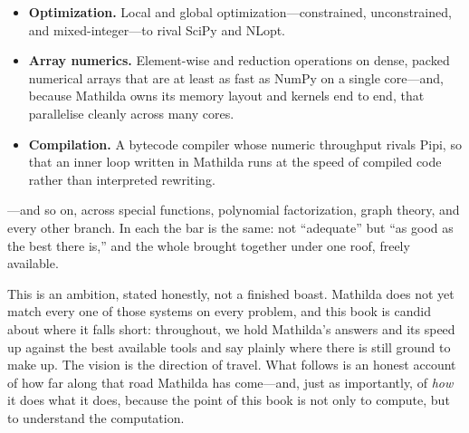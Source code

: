 \begin{itemize}
        differential-equation solving at the level of LAPACK, SciPy, and Julia.
  \item \textbf{Optimization.} Local and global optimization---constrained,
        unconstrained, and mixed-integer---to rival SciPy and NLopt.
  \item \textbf{Array numerics.} Element-wise and reduction operations on dense,
        packed numerical arrays that are at least as fast as NumPy on a single
        core---and, because Mathilda owns its memory layout and kernels end to end,
        that parallelise cleanly across many cores.
  \item \textbf{Compilation.} A bytecode compiler whose numeric throughput rivals
        Pipi, so that an inner loop written in Mathilda runs at the speed of compiled
        code rather than interpreted rewriting.
\end{itemize}

\noindent
---and so on, across special functions, polynomial factorization, graph theory, and
every other branch. In each the bar is the same: not ``adequate'' but ``as good as
the best there is,'' and the whole brought together under one roof, freely available.

This is an ambition, stated honestly, not a finished boast. Mathilda does not yet
match every one of those systems on every problem, and this book is candid about where
it falls short: throughout, we hold Mathilda's answers and its speed up against the
best available tools and say plainly where there is still ground to make up. The
vision is the direction of travel. What follows is an honest account of how far along
that road Mathilda has come---and, just as importantly, of \emph{how} it does what it
does, because the point of this book is not only to compute, but to understand the
computation.
